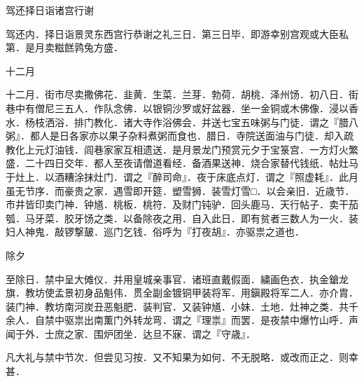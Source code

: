 \documentclass[]{article}
\begin{document}
驾还择日诣诸宫行谢

驾还内．择日诣景灵东西宫行恭谢之礼三日．第三日毕．即游幸别宫观或大臣私第．是月卖糍餻鹑兔方盛．

十二月

十二月．街市尽卖撒佛花．韭黄．生菜．兰芽．勃荷．胡桃．泽州饧．初八日．街巷中有僧尼三五人．作队念佛．以银铜沙罗或好盆器．坐一金铜或木佛像．浸以香水．杨枝洒浴．排门教化．诸大寺作浴佛会．并送七宝五味粥与门徒．谓之『腊八粥』．都人是日各家亦以果子杂料煮粥而食也．腊日．寺院送面油与门徒．却入疏教化上元灯油钱．闾巷家家互相遗送．是月景龙门预赏元夕于宝箓宫．一方灯火繁盛．二十四日交年．都人至夜请僧道看经．备酒果送神．烧合家替代钱纸．帖灶马于灶上．以酒糟涂抹灶门．谓之『醉司命』．夜于床底点灯．谓之『照虚耗』．此月虽无节序．而豪贵之家．遇雪即开筵．塑雪狮．装雪灯雪□．以会亲旧．近歳节．市井皆印卖门神．钟馗．桃板．桃符．及财门钝驴．回头鹿马．天行帖子．卖干茄瓠．马牙菜．胶牙饧之类．以备除夜之用．自入此日．即有贫者三数人为一火．装妇人神鬼．敲锣撃皷．巡门乞钱．俗呼为『打夜胡』．亦驱祟之道也．

除夕

至除日．禁中呈大傩仪．并用皇城亲事官．诸班直戴假面．繍画色衣．执金鎗龙旗．教坊使孟景初身品魁伟．贯全副金镀铜甲装将军．用鎭殿将军二人．亦介胄．装门神．教坊南河炭丑恶魁肥．装判官．又装钟馗．小妹．土地．灶神之类．共千余人．自禁中驱祟出南薫门外转龙弯．谓之『理祟』而罢．是夜禁中爆竹山呼．声闻于外．士庶之家．围炉团坐．达旦不寐．谓之『守歳』．

凡大礼与禁中节次．但尝见习按．又不知果为如何．不无脱略．或改而正之．则幸甚．
\end{document}
